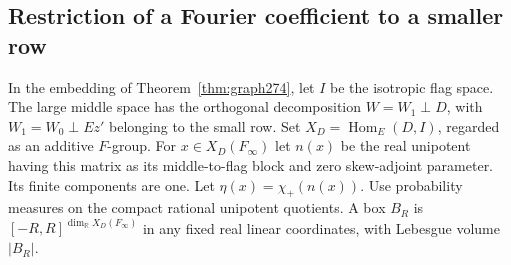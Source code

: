 \documentclass[a4paper,11pt]{article}
\theoremstyle{definition}
\theoremstyle{remark}
\numberwithin{equation}{section}
\begin{document}
\subsection{Restriction of a Fourier coefficient to a smaller row}\label{nav:IX-45}
In the embedding of Theorem~\ref{thm:graph274}, let \(I\) be
the isotropic flag space. The large middle space has the
orthogonal decomposition \(W=W_1\perp D\), with
\(W_1=W_0\perp Ez'\) belonging to the small row.
Set \(X_D=\operatorname{Hom}_E(D,I)\), regarded as an
additive \(F\)-group. For \(x\in X_D(F_\infty)\) let
\(n(x)\) be the real unipotent having this matrix as its
middle-to-flag block and zero skew-adjoint parameter. Its
finite components are one. Let \(\eta(x)=\chi_+(n(x))\).
Use probability measures on the compact rational unipotent
quotients. A box \(B_R\) is \([-R,R]^{\dim_{\mathbb R} X_D(F_\infty)}\)
in any fixed real linear coordinates, with Lebesgue volume \(|B_R|\).
\end{document}
